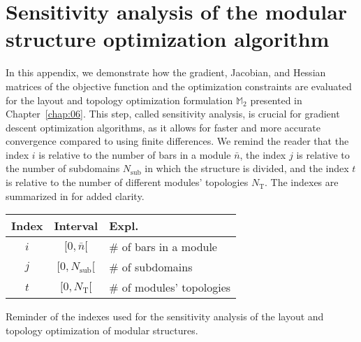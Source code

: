 \chapter{Sensitivity analysis of the modular structure optimization algorithm} \label{app:01}
In this appendix, we demonstrate how the gradient, Jacobian, and Hessian matrices of the objective function and the optimization constraints are evaluated for the layout and topology optimization formulation $\mathbb{M}_2$ presented in Chapter~\ref{chap:06}. This step, called sensitivity analysis, is crucial for gradient descent optimization algorithms, as it allows for faster and more accurate convergence compared to using finite differences.  We remind the reader that the index $i$ is relative to the number of bars in a module $\bar{n}$, the index $j$ is relative to the number of subdomains $N_\text{sub}$ in which the structure is divided, and the index $t$ is relative to the number of different modules' topologies $N_\text{T}$. The indexes are summarized in  for added clarity.

\begin{margintable}
    \small
    \centering
    \begin{tabular}{ccx{1.4cm}}
    \toprule
    \textbf{Index}        & \textbf{Interval} & \textbf{Expl.} \\ \midrule
    $i$ &$[0,\bar{n}[$& \# of bars in a module\\
    $j$ &$[0,N_\text{sub}[$& \# of subdomains\\
    $t$ &$[0,N_\text{T}[$& \# of modules' topologies\\
    \bottomrule
    \end{tabular}
    \caption{Reminder of the indexes used for the sensitivity analysis of the layout and topology optimization of modular structures.}
    \label{tab:appA_indexes}
\end{margintable}

